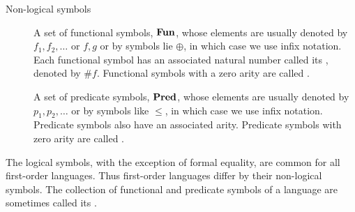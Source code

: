 \begin{definition}
\begin{description}
    \item[Non-logical symbols]
    \hfill
    \begin{thmenum}[resume=def:first_order_language]
       A set of functional symbols, \( \operatorname{\mathbf{Fun}} \), whose elements are usually denoted by \( f_1, f_2, \ldots \) or \( f, g \) or by symbols lie \( \oplus \), in which case we use infix notation. Each functional symbol has an associated natural number called its , denoted by \( \# f \). Functional symbols with a zero arity are called .

       A set of predicate symbols, \( \operatorname{\mathbf{Pred}} \), whose elements are usually denoted by \( p_1, p_2, \ldots \) or by symbols like \( \leq \), in which case we use infix notation. Predicate symbols also have an associated arity. Predicate symbols with zero arity are called .
    \end{thmenum}
  \end{description}

  The logical symbols, with the exception of formal equality, are common for all first-order languages. Thus first-order languages differ by their non-logical symbols. The collection of functional and predicate symbols of a language are sometimes called its .
\end{definition}

